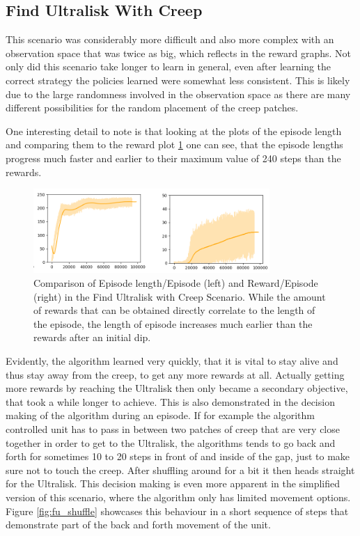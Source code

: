 \subsection{Find Ultralisk With Creep}
This scenario was considerably more difficult and also more complex with an observation space that was twice as big, which reflects in the reward graphs. Not only did this scenario take longer to learn in general, even after learning the correct strategy the policies learned were somewhat less consistent. This is likely due to the large randomness involved in the observation space as there are many different possibilities for the random placement of the creep patches. 

One interesting detail to note is that looking at the plots of the episode length and comparing them to the reward plot \ref{fig:elength} one can see, that the episode lengths progress much faster and earlier to their maximum value of 240 steps than the rewards. 

\begin{figure}[htb]
  \centering
      \includegraphics[width=0.8\textwidth]{Figures/plots/fuwc_elength.png}
  \caption{Comparison of Episode length/Episode (left) and Reward/Episode (right) in the Find Ultralisk with Creep Scenario. While the amount of rewards that can be obtained directly correlate to the length of the episode, the length of episode increases much earlier than the rewards after an initial dip.}
  \label{fig:elength}
\end{figure}

Evidently, the algorithm learned very quickly, that it is vital to stay alive and thus stay away from the creep, to get any more rewards at all. Actually getting more rewards by reaching the Ultralisk then only became a secondary objective, that took a while longer to achieve. This is also demonstrated in the decision making of the algorithm during an episode. If for example the algorithm controlled unit has to pass in between two patches of creep that are very close together in order to get to the Ultralisk, the algorithms tends to go back and forth for sometimes 10 to 20 steps in front of and inside of the gap, just to make sure not to touch the creep. After shuffling around for a bit it then heads straight for the Ultralisk. This decision making is even more apparent in the simplified version of this scenario, where the algorithm only has limited movement options. Figure \ref{fig:fu_shuffle} showcases this behaviour in a short sequence of steps that demonstrate part of the back and forth movement of the unit.

